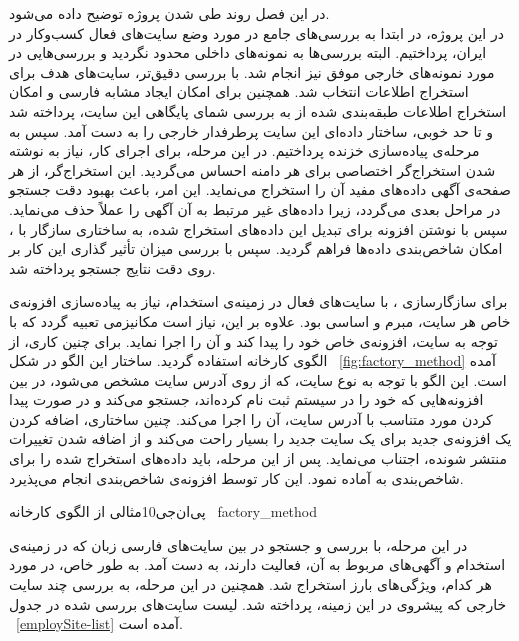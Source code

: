 
در این فصل روند طی شدن پروژه توضیح داده می‌شود.
\\
در این پروژه، در ابتدا به بررسی‌های جامع در مورد وضع سایت‌های فعال کسب‌وکار در ایران، پرداختیم. البته بررسی‌ها به نمونه‌های داخلی محدود نگردید و بررسی‌هایی در مورد نمونه‌های خارجی موفق نیز انجام شد. با بررسی دقیق‌تر، سایت‌های هدف برای استخراج اطلاعات انتخاب شد. همچنین برای امکان ایجاد مشابه فارسی  و امکان استخراج اطلاعات طبقه‌بندی شده از  به بررسی شمای پایگاهی این سایت، پرداخته شد و تا حد خوبی، ساختار داده‌ای این سایت پرطرفدار خارجی را به دست آمد. سپس به مرحله‌ی پیاده‌سازی خزنده پرداختیم. در این مرحله، برای اجرای کار، نیاز به نوشته شدن استخراج‌گر اختصاصی برای هر دامنه احساس می‌گردید. این استخراج‌گر، از هر صفحه‌ی آگهی داده‌های مفید آن را استخراج می‌نماید. این امر، باعث بهبود دقت جستجو در مراحل بعدی می‌گردد، زیرا داده‌های غیر مرتبط به آن آگهی را عملاً حذف می‌نماید. سپس با نوشتن افزونه برای تبدیل این داده‌های استخراج شده، به ساختاری سازگار با ، امکان شاخص‌بندی داده‌ها فراهم گردید. سپس با بررسی میزان تأثیر گذاری این کار بر روی دقت نتایج جستجو پرداخته شد.

برای سازگارسازی ، با سایت‌های فعال در زمینه‌ی استخدام، نیاز به پیاده‌سازی افزونه‌ی خاص هر سایت، مبرم و اساسی بود. علاوه بر این، نیاز است مکانیزمی تعبیه گردد که با توجه به سایت، افزونه‌ی خاص خود را پیدا کند و آن را اجرا نماید. برای چنین کاری، از الگوی کارخانه استفاده گردید. ساختار این الگو در شکل ~\ref{fig:factory_method} آمده است. این الگو با توجه به نوع سایت، که از روی آدرس سایت مشخص می‌شود، در بین افزونه‌هایی که خود را در سیستم ثبت نام کرده‌اند، جستجو می‌کند و در صورت پیدا کردن مورد متناسب با آدرس سایت، آن را اجرا می‌کند. چنین ساختاری، اضافه کردن یک افزونه‌ی جدید برای یک سایت جدید را بسیار راحت می‌کند و از اضافه شدن تغییرات منتشر شونده، اجتناب می‌نماید. پس از این مرحله، باید داده‌های استخراج شده را برای شاخص‌بندی به  آماده نمود. این کار توسط افزونه‌ی شاخص‌بندی انجام می‌پذیرد.

‌پی‌ان‌جی{10}{مثالی از الگوی کارخانه
~\cite{Factory-method}}{factory_method}

در این مرحله، با بررسی و جستجو در بین سایت‌های فارسی زبان که در زمینه‌ی استخدام و آگهی‌های مربوط به آن، فعالیت دارند، به دست آمد. به طور خاص، در مورد هر کدام، ویژگی‌های بارز استخراج شد. همچنین در این مرحله، به بررسی چند سایت خارجی که پیشروی در این زمینه، پرداخته شد. لیست سایت‌های بررسی شده در جدول  ~\ref{employSite-list}  آمده است.

